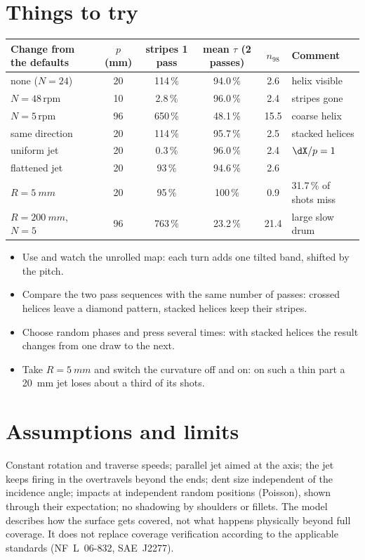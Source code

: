 \documentclass[11pt,a4paper]{article}
\begin{document}


\section{Things to try}

\begin{center}
\small
\begin{tabular}{@{}lccccl@{}}
\toprule
Change from the defaults & $p$ (mm) & stripes 1 pass & mean $\tau$ (2 passes) & $n_{98}$ & Comment\\ \midrule
none ($N=24$) & 20 & 114\,\% & 94.0\,\% & 2.6 & helix visible\\
$N=48$\,rpm & 10 & 2.8\,\% & 96.0\,\% & 2.4 & stripes gone\\
$N=5$\,rpm & 96 & 650\,\% & 48.1\,\% & 15.5 & coarse helix\\
same direction & 20 & 114\,\% & 95.7\,\% & 2.5 & stacked helices\\
uniform jet & 20 & 0.3\,\% & 96.0\,\% & 2.4 & $\dX/p=1$\\
flattened jet & 20 & 93\,\% & 94.6\,\% & 2.6 & \\
$R=\SI{5}{mm}$ & 20 & 95\,\% & 100\,\% & 0.9 & 31.7\,\% of shots miss\\
$R=\SI{200}{mm}$, $N=5$ & 96 & 763\,\% & 23.2\,\% & 21.4 & large slow drum\\ \bottomrule
\end{tabular}
\end{center}

\begin{trybox}
\begin{itemize}[nosep,leftmargin=*]
\item Use  and watch the unrolled map: each turn adds one tilted band, shifted by the pitch.
\item Compare the two pass sequences with the same number of passes: crossed helices leave a diamond pattern, stacked helices keep their stripes.
\item Choose random phases and press  several times: with stacked helices the result changes from one draw to the next.
\item Take $R=\SI{5}{mm}$ and switch the curvature off and on: on such a thin part a \SI{20}{mm} jet loses about a third of its shots.
\end{itemize}
\end{trybox}

\section{Assumptions and limits}
Constant rotation and traverse speeds; parallel jet aimed at the axis; the jet keeps firing in the overtravels beyond the ends; dent size independent of the incidence angle; impacts at independent random positions (Poisson), shown through their expectation; no shadowing by shoulders or fillets. The model describes how the surface gets covered, not what happens physically beyond full coverage. It does not replace coverage verification according to the applicable standards (NF~L~06-832, SAE~J2277).
\end{document}
